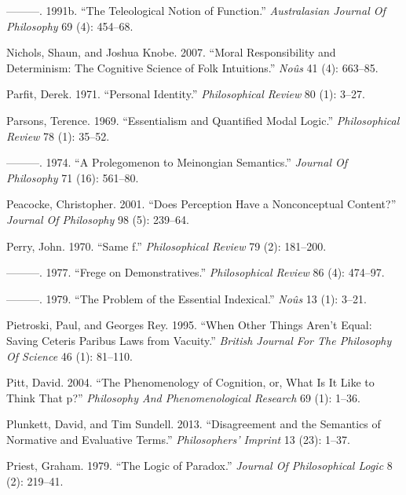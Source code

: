 \documentclass[
  10pt,
  letterpaper,
  DIV=11,
  numbers=noendperiod,
  twoside]{scrartcl}
\newlength{\cslhangindent}
\newenvironment{CSLReferences}[2] %
 {\begin{list}{}{%
  \setlength{\itemindent}{0pt}
  \setlength{\leftmargin}{0pt}
  \setlength{\parsep}{0pt}
  \ifodd #1
   \setlength{\leftmargin}{\cslhangindent}
   \setlength{\itemindent}{-1\cslhangindent}
  \fi
  \setlength{\itemsep}{#2\baselineskip}}}
 {\end{list}}
\begin{document}
\begin{CSLReferences}{1}{0}
---------. 1991b. {``The Teleological Notion of Function.''}
\emph{Australasian Journal Of Philosophy} 69 (4): 454--68.

Nichols, Shaun, and Joshua Knobe. 2007. {``Moral Responsibility and
Determinism: The Cognitive Science of Folk Intuitions.''} \emph{Noûs} 41
(4): 663--85.

Parfit, Derek. 1971. {``Personal Identity.''} \emph{Philosophical
Review} 80 (1): 3--27.

Parsons, Terence. 1969. {``Essentialism and Quantified Modal Logic.''}
\emph{Philosophical Review} 78 (1): 35--52.

---------. 1974. {``A Prolegomenon to Meinongian Semantics.''}
\emph{Journal Of Philosophy} 71 (16): 561--80.

Peacocke, Christopher. 2001. {``Does Perception Have a Nonconceptual
Content?''} \emph{Journal Of Philosophy} 98 (5): 239--64.

Perry, John. 1970. {``Same f.''} \emph{Philosophical Review} 79 (2):
181--200.

---------. 1977. {``Frege on Demonstratives.''} \emph{Philosophical
Review} 86 (4): 474--97.

---------. 1979. {``The Problem of the Essential Indexical.''}
\emph{Noûs} 13 (1): 3--21.

Pietroski, Paul, and Georges Rey. 1995. {``When Other Things Aren't
Equal: Saving Ceteris Paribus Laws from Vacuity.''} \emph{British
Journal For The Philosophy Of Science} 46 (1): 81--110.

Pitt, David. 2004. {``The Phenomenology of Cognition, or, What Is It
Like to Think That p?''} \emph{Philosophy And Phenomenological Research}
69 (1): 1--36.

Plunkett, David, and Tim Sundell. 2013. {``Disagreement and the
Semantics of Normative and Evaluative Terms.''} \emph{Philosophers'
Imprint} 13 (23): 1--37.

Priest, Graham. 1979. {``The Logic of Paradox.''} \emph{Journal Of
Philosophical Logic} 8 (2): 219--41.


\end{CSLReferences}
\end{document}
